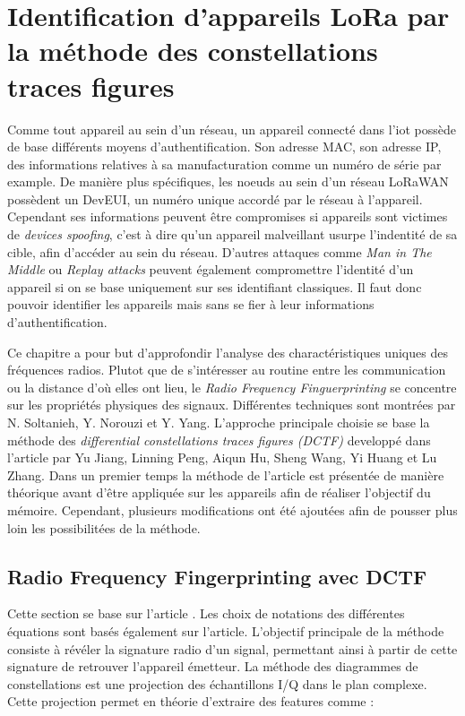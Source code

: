 \chapter{Identification d'appareils LoRa par la méthode des constellations traces figures}

Comme tout appareil au sein d'un réseau, un appareil connecté dans l'iot possède de base différents moyens d'authentification. Son adresse MAC, son adresse IP, des informations relatives à sa manufacturation comme un numéro de série par example. De manière plus spécifiques, les noeuds au sein d'un réseau LoRaWAN possèdent un DevEUI, un numéro unique accordé par le réseau à l'appareil. Cependant ses informations peuvent être compromises si appareils sont victimes de \textit{devices spoofing}, c'est à dire qu'un appareil malveillant usurpe l'indentité de sa cible, afin d'accéder au sein du réseau. D'autres attaques comme \textit{Man in The Middle} ou \textit{Replay attacks} peuvent également compromettre l'identité d'un appareil si on se base uniquement sur ses identifiant classiques\cite{attack}. Il faut donc pouvoir identifier les appareils mais sans se fier à leur informations d'authentification.

\vspace{0.1cm}

Ce chapitre a pour but d'approfondir l'analyse des charactéristiques uniques des fréquences radios. Plutot que de s'intéresser au routine entre les communication ou la distance d'où elles ont lieu, le \textit{Radio Frequency Finguerprinting} se concentre sur les propriétés physiques des signaux. Différentes techniques sont montrées par N. Soltanieh, Y. Norouzi et Y. Yang\cite{rffi1}. L'approche principale choisie se base la méthode des \textit{differential constellations traces figures (DCTF)} developpé dans l'article \cite{loraDCTF} par Yu Jiang, Linning Peng, Aiqun Hu, Sheng Wang, Yi Huang et Lu Zhang. Dans un premier temps la méthode de l'article est présentée de manière théorique avant d'être appliquée sur les appareils afin de réaliser l'objectif du mémoire. Cependant, plusieurs modifications ont été ajoutées afin de pousser plus loin les possibilitées de la méthode.

\section{Radio Frequency Fingerprinting avec DCTF}\label{DCTF}

Cette section se base sur l'article \cite{loraDCTF}. Les choix de notations des différentes équations sont basés également sur l'article. L'objectif principale de la méthode consiste à révéler la signature radio d'un signal, permettant ainsi à partir de cette signature de retrouver l'appareil émetteur. La méthode des diagrammes de constellations est une projection des échantillons I/Q dans le plan complexe. Cette projection permet en théorie d'extraire des features comme :

